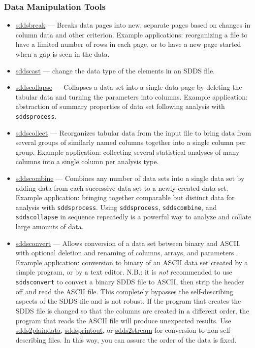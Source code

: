 \documentclass[11pt]{article}
\newcommand{\progref}[1]{\hyperref{#1}{{\tt #1} (}{)}{#1}}
\begin{document}
\subsubsection{ Data Manipulation Tools}
\begin{itemize}

\item \progref{sddsbreak} --- Breaks data pages into new, separate pages based on changes in column data and other
criterion.  Example applications: reorganizing a file to have a limited number of rows in each page, or to have a
new page started when a gap is seen in the data.

\item \progref{sddscast} --- change the data type of the elements in an SDDS file.

\item \progref{sddscollapse} --- Collapses a data set into a single data page by deleting the tabular data and
turning the parameters into columns.  Example application: abstraction of summary properties of data set following
analysis with \verb|sddsprocess|.

\item \progref{sddscollect} --- Reorganizes tabular data from the
input file to bring data from several groups of similarly named
columns together into a single column per group.  Example application:
collecting several statistical analyses of many columns into a single
column per analysis type.

\item \progref{sddscombine} --- Combines any number of data sets into a single data set by adding data from each
successive data set to a newly-created data set.  Example application: bringing together comparable but distinct
data for analysis with \verb|sddsprocess|.  Using \verb|sddsprocess|, \verb|sddscombine|, and \verb|sddscollapse|
in sequence repeatedly is a powerful way to analyze and collate large amounts of data.

\item \progref{sddsconvert} --- Allows conversion of a data set between binary and ASCII, with optional deletion
and renaming of columns, arrays, and parameters .  Example application: conversion to binary of an ASCII data set
created by a simple program, or by a text editor.  N.B.: it is {\em not} recommended to use \verb|sddsconvert| to
convert a binary SDDS file to ASCII, then strip the header off and read the ASCII file.  This completely
bypasses the self-describing aspects of the SDDS file and is not robust.  If the program that creates the SDDS
file is changed so that the columns are created in a different order, the program that reads the ASCII file
will produce unexpected results. Use \progref{sdds2plaindata}, \progref{sddsprintout}, or \progref{sdds2stream}
for conversion to non-self-describing files.  In this way, you can assure the order of the data is fixed.


\end{itemize}
\end{document}
